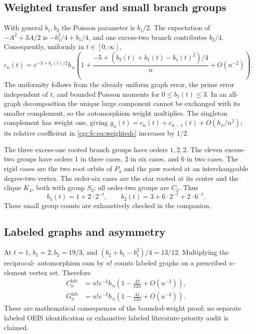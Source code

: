 \documentclass[11pt,letterpaper]{article}
\numberwithin{equation}{section}
\theoremstyle{definition}\newtheorem{definition}[theorem]{Definition}
\theoremstyle{remark}\newtheorem{remark}[theorem]{Remark}
\begin{document}
\subsection{Weighted transfer and small branch groups}\label{cgr:fc:sub:groups}
With general $b_1,b_2$ the Poisson parameter is $b_1/2$.
The expectation of $-A^2+3A/2$ is
$-b_1^2/4+b_1/4$, and one excess-two branch contributes $b_2/4$.
Consequently, uniformly in $t\in[0,\infty]$,
\begin{equation}\label{cgr:fc:eq:weightedc}
 c_n(t)=e^{-3+b_1(t)/2}h_n
 \left(1+\frac{-5+(b_2(t)+b_1(t)-b_1(t)^2)/4}{n}
              +O(n^{-2})\right).
\end{equation}
The uniformity follows from the already uniform graph error, the
prime error independent of $t$, and bounded Poisson moments for
$0\le b_1(t)\le3$. In an all-graph decomposition the unique large
component cannot be exchanged with its smaller complement, so the
automorphism weight multiplies. The singleton complement has
weight one, giving $g_n(t)=c_n(t)+c_{n-1}(t)+O(h_n/n^2)$;
its relative coefficient in \eqref{cgr:fc:eq:weightedc} increases by $1/2$.

The three excess-one rooted branch groups have orders $1,2,2$.
The eleven excess-two groups have orders $1$ in three cases,
$2$ in six cases, and $6$ in two cases. The rigid cases are the
two root orbits of $P_4$ and the paw rooted at an interchangeable
degree-two vertex. The order-six cases are the star rooted at its
center and the clique $K_4$, both with group $S_3$; all order-two
groups are $C_2$. Thus
\begin{equation}\label{cgr:fc:eq:weighted-b}
 b_1(t)=1+2\cdot2^{-t},\qquad
 b_2(t)=3+6\cdot2^{-t}+2\cdot6^{-t}.
\end{equation}
These small group counts are exhaustively checked in the companion.

\subsection{Labeled graphs and asymmetry}
At $t=1$, $b_1=2,b_2=19/3$, and
$(b_2+b_1-b_1^2)/4=13/12$. Multiplying the reciprocal-
automorphism sum by $n!$ counts labeled graphs on a prescribed
$n$-element vertex set. Therefore
\begin{align}
 C_n^{\mathrm{lab}}&=n!e^{-2}h_n
          \left(1-\frac{47}{12n}+O(n^{-2})\right),\label{cgr:fc:eq:labeledc}\\
 G_n^{\mathrm{lab}}&=n!e^{-2}h_n
          \left(1-\frac{41}{12n}+O(n^{-2})\right).\label{cgr:fc:eq:labeledg}
\end{align}
These are mathematical consequences of the bounded-weight proof;
no separate labeled OEIS identification or exhaustive labeled
literature-priority audit is claimed.
\end{document}

